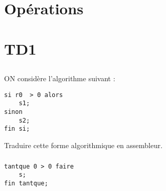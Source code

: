 \documentclass[12pt,a4paper,openany]{book}
\begin{document}
	\setcounter{tocdepth}{2}
	\setcounter{secnumdepth}{3}
	\maketitle
	\tableofcontents
	\chapter{Opérations}
	
	

	

	
	
	
	\chapter{TD1}
	\section{}
\subsection{}
	ON considère l'algorithme suivant : 
\begin{lstlisting}[language=Algo]
si r0  > 0 alors
	s1;
sinon
	s2;
fin si;
\end{lstlisting}
Traduire cette forme algorithmique en assembleur.

\subsection{}
\begin{lstlisting}[language=Algo]
tantque 0 > 0 faire
	s;
fin tantque;
\end{lstlisting}


\section{}
\subsection{}


\end{document}
